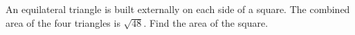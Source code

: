 An equilateral triangle is built externally on each side of a square. The combined area of the four triangles is $\sqrt{48}$. Find the area of the square.
